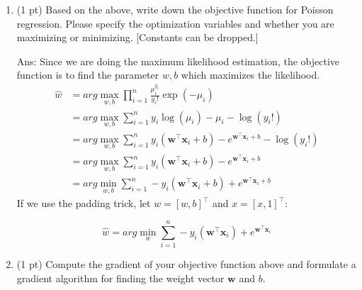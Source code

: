 \documentclass[10pt,letter,notitlepage]{article}
\newcommand{\wv}{\mathbf{w}}
\newcommand{\xv}{\mathbf{x}}
\newcommand{\ans}[1]{{\color{orange}\textsf{Ans}: #1}}
\newcounter{exercise}
\begin{document}
\begin{exercise}
\begin{enumerate}
\ans{
  $\mu_i \ge 0$, so $\log \mu_i$ ranges from negative infinity to positive infinity, which is the same range as $\wv^\top \xv_i + b$.
  In other words, they both range over $\mathbb{R}$.
} 
	
\item (1 pt) Based on the above, write down the objective function for Poisson regression. Please specify the optimization variables and whether you are maximizing or minimizing. [Constants can be dropped.]

\ans{
  Since we are doing the maximum likelihood estimation, the objective function is to find the parameter $w, b$ which maximizes the likelihood.
  \begin{align*}
  \hat{w} &= arg\underset{w, b}\max \prod_{i=1}^{n} \frac{\mu_i^{y_i}}{y_i!} \exp(-\mu_i) \\
  &= arg\underset{w, b}\max \sum_{i=1}^n y_i \log(\mu_i) - \mu_i - \log(y_i!) \\
  &= arg\underset{w, b}\max \sum_{i=1}^n y_i (\wv^\top \xv_i + b) - e^{\wv^\top \xv_i + b} - \log(y_i!)\\
  &= arg\underset{w, b}\max \sum_{i=1}^n y_i (\wv^\top \xv_i + b) - e^{\wv^\top \xv_i + b} \\
  &= arg\underset{w, b}{\min} \sum_{i=1}^n - y_i (\wv^\top \xv_i + b) + e^{\wv^\top \xv_i + b}
  \end{align*}
  If we use the padding trick, let $w = [w, b]^\top$ and $x = [x, 1]^\top$:

  $$
  \hat{w} = arg\underset{w}\min \sum_{i=1}^n - y_i (\wv^\top \xv_i) + e^{\wv^\top \xv_i}
  $$
} 
	
\item (1 pt) Compute the gradient of your objective function above and formulate a gradient algorithm for finding the weight vector $\wv$ and $b$. 
	

\end{enumerate}
\end{exercise}
\end{document}
